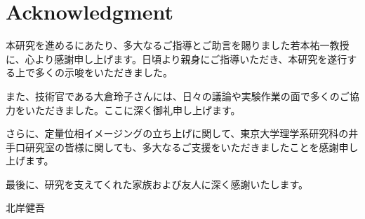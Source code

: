 \chapter*{Acknowledgment}
本研究を進めるにあたり、多大なるご指導とご助言を賜りました若本祐一教授に、心より感謝申し上げます。日頃より親身にご指導いただき、本研究を遂行する上で多くの示唆をいただきました。

また、技術官である大倉玲子さんには、日々の議論や実験作業の面で多くのご協力をいただきました。ここに深く御礼申し上げます。

さらに、定量位相イメージングの立ち上げに関して、東京大学理学系研究科の井手口研究室の皆様に関しても、多大なるご支援をいただきましたことを感謝申し上げます。

最後に、研究を支えてくれた家族および友人に深く感謝いたします。
\begin{flushright}
	 北岸健吾
\end{flushright}
